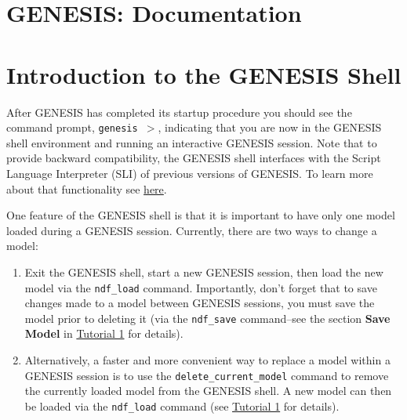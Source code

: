 \documentclass[12pt]{article}
\begin{document}
\section*{GENESIS: Documentation}

\section*{Introduction to the GENESIS Shell}

After GENESIS has completed its startup procedure you should see the command prompt, {\tt genesis $>$}, indicating that you are now in the GENESIS shell environment and running an interactive GENESIS session. Note that to provide backward compatibility, the GENESIS shell interfaces with the Script Language Interpreter (SLI) of previous versions of GENESIS. To learn more about that functionality see \href{../backward-compatibility/backward-compatibility.pdf}{here}.

One feature of the GENESIS shell is that it is important to have only one model loaded during a GENESIS session. Currently, there are two ways to change a model:

\begin{enumerate}

\item Exit the GENESIS shell, start a new GENESIS session, then load the new model  via the {\tt ndf\_load} command. Importantly, don't forget that to save changes made to a model between GENESIS sessions, you must save the model prior to deleting it (via the {\tt ndf\_save} command--see the section {\bf Save Model} in \href{../tutorial1/tutorial1.pdf}{Tutorial 1} for details).

\item Alternatively, a faster and more convenient way to replace a model within a GENESIS session is to use the {\tt delete\_current\_model} command to remove the currently loaded model from the GENESIS shell. A new model can then be loaded via the {\tt ndf\_load} command (see \href{../tutorial1/tutorial1.pdf}{Tutorial 1} for details).

\end{enumerate}
\end{document}
